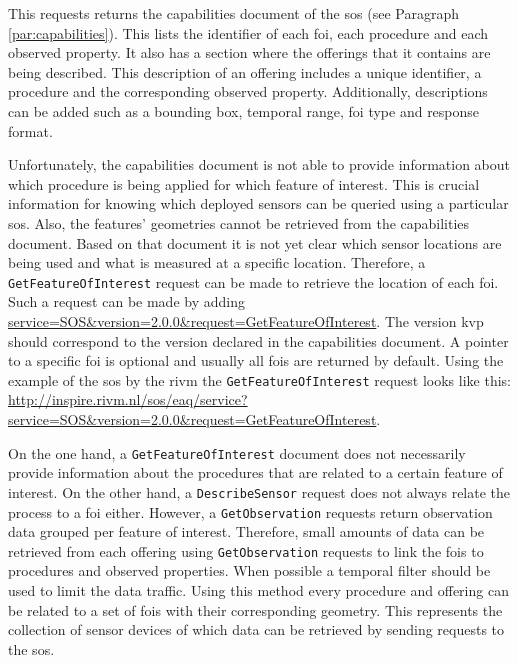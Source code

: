 This requests returns the capabilities document of the \ac{sos} (see Paragraph \ref{par:capabilities}). This lists the identifier of each \ac{foi}, each procedure and each observed property. It also has a section where the offerings that it contains are being described. This description of an offering includes a unique identifier, a procedure and the corresponding observed property. Additionally, descriptions can be added such as a bounding box, temporal range, \ac{foi} type and response format.  

\begin{sloppypar}
	Unfortunately, the capabilities document is not able to provide information about which procedure is being applied for which feature of interest. This is crucial information for knowing which deployed sensors can be queried using a particular \ac{sos}. Also, the features' geometries cannot be retrieved from the capabilities document. Based on that document it is not yet clear which sensor locations are being used and what is measured at a specific location. Therefore, a \texttt{GetFeatureOfInterest} request can be made to retrieve the location of each \ac{foi}. Such a request can be made by adding \url{service=SOS&version=2.0.0&request=GetFeatureOfInterest}. The version \ac{kvp} should correspond to the version declared in the capabilities document. A pointer to a specific \ac{foi} is optional and usually all \acp{foi} are returned by default. Using the example of the \ac{sos} by the \ac{rivm} the \texttt{GetFeatureOfInterest} request looks like this: \url{http://inspire.rivm.nl/sos/eaq/service?service=SOS&version=2.0.0&request=GetFeatureOfInterest}.    
\end{sloppypar}

On the one hand, a \texttt{GetFeatureOfInterest} document does not necessarily provide information about the procedures that are related to a certain feature of interest. On the other hand, a \texttt{DescribeSensor} request does not always relate the process to a \ac{foi} either. However, a \texttt{GetObservation} requests return observation data grouped per feature of interest. Therefore, small amounts of data can be retrieved from each offering using \texttt{GetObservation} requests to link the \acp{foi} to procedures and observed properties. When possible a temporal filter should be used to limit the data traffic. Using this method every procedure and offering can be related to a set of \acp{foi} with their corresponding geometry. This represents the collection of sensor devices of which data can be retrieved by sending requests to the \ac{sos}. 

